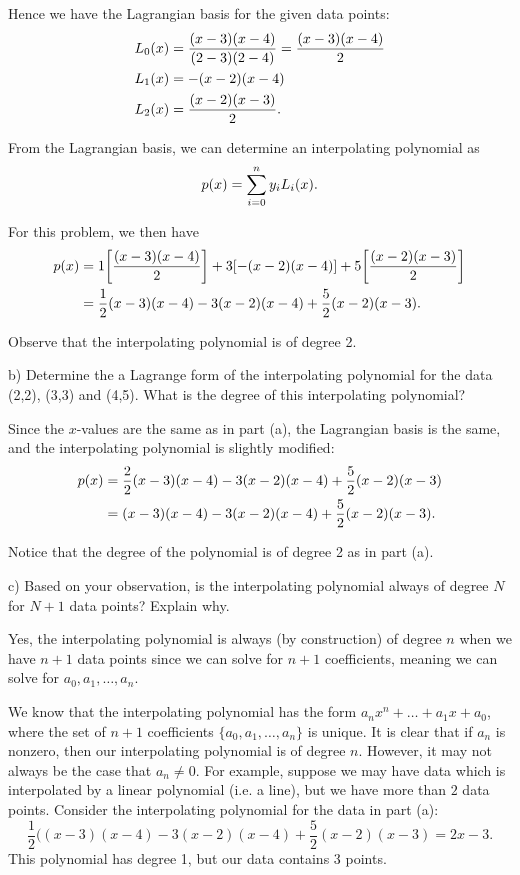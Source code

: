 \documentclass[12pt,a4paper]{article}
\begin{document}
Hence we have the Lagrangian basis for the given data points:
\begin{align*}
    L_0\qty(x) &= \frac{\qty(x-3)\qty(x-4)}{\qty(2-3)\qty(2-4)} = \frac{\qty(x-3)\qty(x-4)}{2} \\
    L_1\qty(x) &= -\qty(x-2)\qty(x-4) \\
    L_2\qty(x) &= \frac{\qty(x-2)\qty(x-3)}{2}
.\end{align*}

From the Lagrangian basis, we can determine an interpolating polynomial as
\begin{align*}
    p\qty(x) = \sum_{i=0}^{n} y_iL_i\qty(x) 
.\end{align*}

For this problem, we then have
\begin{align*}
    p\qty(x) &= 1\qty[\frac{\qty(x-3)\qty(x-4)}{2}] + 3\qty[-\qty(x-2)\qty(x-4)] + 5\qty[\frac{\qty(x-2)\qty(x-3)}{2}]  \\
    &= \frac{1}{2}\qty(x-3)\qty(x-4) - 3\qty(x-2)\qty(x-4)  + \frac{5}{2}\qty(x-2)\qty(x-3) 
.\end{align*}

Observe that the interpolating polynomial is of degree 2.

b) Determine the a Lagrange form of the interpolating polynomial for the data (2,2), (3,3) and (4,5).
What is the degree of this interpolating polynomial?

Since the $x$-values are the same as in part (a), the Lagrangian basis is the same, and the interpolating polynomial is slightly modified:
\begin{align*}
    p\qty(x) &= \frac{2}{2}\qty(x-3)\qty(x-4) - 3\qty(x-2)\qty(x-4)  + \frac{5}{2}\qty(x-2)\qty(x-3) \\
    &= \qty(x-3)\qty(x-4) - 3\qty(x-2)\qty(x-4)  + \frac{5}{2}\qty(x-2)\qty(x-3) 
.\end{align*}

Notice that the degree of the polynomial is of degree 2 as in part (a).

c) Based on your observation, is the interpolating polynomial always of degree $N$ for $N+1$ data points? 
Explain why.

Yes, the interpolating polynomial is always (by construction) of degree $n$ when we have $n+1$ data points since we can solve for $n+1$ coefficients, meaning we can solve for $a_0,a_1,\ldots,a_n$.

{\color{red} We know that the interpolating polynomial has the form $a_{n}x^{n} + \ldots + a_1 x + a_0$, where the set of $n+1$ coefficients $\{ a_0,a_1, \ldots, a_{n} \} $ is unique.
    It is clear that if $a_{n}$ is nonzero, then our interpolating polynomial is of degree $n$.
    However, it may not always be the case that $a_{n} \ne 0$.
    For example, suppose we may have data which is interpolated by a linear polynomial (i.e. a line), but we have more than $2$ data points.
    Consider the interpolating polynomial for the data in part (a):
    \[
    \frac{1}{2}(\left( x-3 \right)\left( x-4 \right) - 3\left( x-2 \right)\left( x-4 \right) + \frac{5}{2}\left( x-2 \right)\left( x-3 \right) = 2 x - 3
    .\]
    This polynomial has degree 1, but our data contains 3 points.
    }
\end{document}
